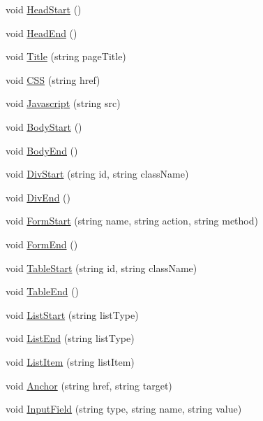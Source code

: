 \begin{DoxyCompactItemize}
\item 
void \hyperlink{classPageStructureMaker_a14312134cb108f91f2e6d9cbd6916e97}{Head\-Start} ()
\item 
void \hyperlink{classPageStructureMaker_ad64115d592b0989b422a93f85278186e}{Head\-End} ()
\item 
void \hyperlink{classPageStructureMaker_a81e902ddc0c0287df1ba0f614a3774d6}{Title} (string page\-Title)
\item 
void \hyperlink{classPageStructureMaker_aacdb11817f8ab246bc59c552e04e862d}{C\-S\-S} (string href)
\item 
void \hyperlink{classPageStructureMaker_ac221d1169f4dbcef6adb00938919193d}{Javascript} (string src)
\item 
void \hyperlink{classPageStructureMaker_ab7a645675166f34fac99f1ed8feb7c27}{Body\-Start} ()
\item 
void \hyperlink{classPageStructureMaker_ac91e234e2d54dedd9d7e556fabf21d2b}{Body\-End} ()
\item 
void \hyperlink{classPageStructureMaker_a927f92889555dd316c129f706be86a5c}{Div\-Start} (string id, string class\-Name)
\item 
void \hyperlink{classPageStructureMaker_a2913e76bf188ed777dcd33003ef6207d}{Div\-End} ()
\item 
void \hyperlink{classPageStructureMaker_a3f25d5b844a2251883acb80d8fabb77d}{Form\-Start} (string name, string action, string method)
\item 
void \hyperlink{classPageStructureMaker_a65d97f23bb543f3db5201b2009f7f65a}{Form\-End} ()
\item 
void \hyperlink{classPageStructureMaker_a04e68e69005f3933e0f496c3db474daf}{Table\-Start} (string id, string class\-Name)
\item 
void \hyperlink{classPageStructureMaker_a7f8fefbe7a825c1b7761fc8a0f1bb8e4}{Table\-End} ()
\item 
void \hyperlink{classPageStructureMaker_ac24ce26202757aaa30402155daf8a3d0}{List\-Start} (string list\-Type)
\item 
void \hyperlink{classPageStructureMaker_a8578b1555ad2fc92a9efc7dbf7d1fe87}{List\-End} (string list\-Type)
\item 
void \hyperlink{classPageStructureMaker_adf4116e526026edc3c8a3bcf96a7e929}{List\-Item} (string list\-Item)
\item 
void \hyperlink{classPageStructureMaker_a8c0fae5b599182863066de56ae0cea42}{Anchor} (string href, string target)
\item 
void \hyperlink{classPageStructureMaker_a928ea6f84a8f7833c128034068a4b9a7}{Input\-Field} (string type, string name, string value)

\end{DoxyCompactItemize}
